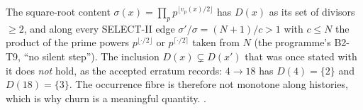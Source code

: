 \begin{remark}\label{rem:B2T9}
The square-root content $\sigma(x)=\prod_pp^{\lfloor v_p(x)/2\rfloor}$ has $D(x)$ as its set of divisors $\ge2$, and along every SELECT-II edge $\sigma'/\sigma=(N+1)/c>1$ with $c\le N$ the product of the prime powers $p^{\lfloor\cdot/2\rfloor}$ or $p^{\lceil\cdot/2\rceil}$ taken from $N$ (the programme's B2-T9, ``no silent step''). The inclusion $D(x)\subsetneq D(x')$ that was once stated with it does \emph{not} hold, as the accepted erratum records: $4\to18$ has $D(4)=\{2\}$ and $D(18)=\{3\}$. The occurrence fibre is therefore not monotone along histories, which is why churn is a meaningful quantity. .
\end{remark}
